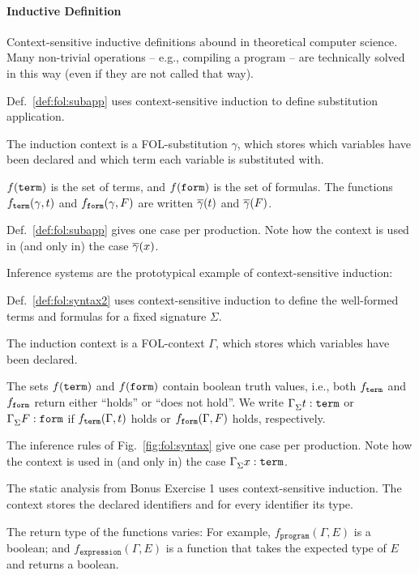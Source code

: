 \paragraph{Inductive Definition}

Context-sensitive inductive definitions abound in theoretical computer science.
Many non-trivial operations -- e.g., compiling a program -- are technically solved in this way (even if they are not called that way).

\begin{example}[Substitution]
Def.~\ref{def:fol:subapp} uses context-sensitive induction to define substitution application.

The induction context is a FOL-substitution $\gamma$, which stores which variables have been declared and which term each variable is substituted with.

$f(\mathtt{term})$ is the set of terms, and $f(\mathtt{form})$ is the set of formulas.
The functions $f_{\mathtt{term}}(\gamma,t)$ and $f_{\mathtt{form}}(\gamma,F)$ are written $\overline{\gamma}(t)$ and $\overline{\gamma}(F)$.

Def.~\ref{def:fol:subapp} gives one case per production.
Note how the context is used in (and only in) the case $\overline{\gamma}(x)$.
\end{example}

Inference systems are the prototypical example of context-sensitive induction:

\begin{example}
Def.~\ref{def:fol:syntax2} uses context-sensitive induction to define the well-formed terms and formulas for a fixed signature $\Sigma$.

The induction context is a FOL-context $\Gamma$, which stores which variables have been declared.

The sets $f(\mathtt{term})$ and $f(\mathtt{form})$ contain boolean truth values, i.e., both $f_{\mathtt{term}}$ and $f_{\mathtt{form}}$ return either ``holds'' or ``does not hold''.
We write $\Gamma^{}_{\Sigma}t:\mathtt{term}$ or $\Gamma^{}_{\Sigma}F:\mathtt{form}$ if $f_{\mathtt{term}}(\Gamma,t)$ holds or $f_{\mathtt{form}}(\Gamma,F)$ holds, respectively.

The inference rules of Fig.~\ref{fig:fol:syntax} give one case per production.
Note how the context is used in (and only in) the case $\Gamma^{}_{\Sigma}x:\mathtt{term}$.
\end{example}

\begin{example}
The static analysis from Bonus Exercise 1 uses context-sensitive induction.
The context stores the declared identifiers and for every identifier its type.

The return type of the functions varies: For example, $f_{\mathtt{program}}(\Gamma,E)$ is a boolean; and $f_{\mathtt{expression}}(\Gamma,E)$ is a function that takes the expected type of $E$ and returns a boolean.
\end{example}

